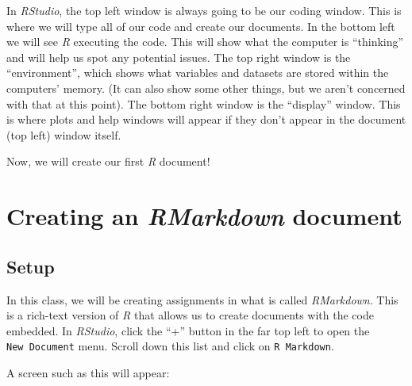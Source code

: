 \documentclass[
  letterpaper,
  DIV=11,
  numbers=noendperiod]{scrreprt}
\begin{document}
In \emph{RStudio}, the top left window is always going to be our coding
window. This is where we will type all of our code and create our
documents. In the bottom left we will see \emph{R} executing the code.
This will show what the computer is ``thinking'' and will help us spot
any potential issues. The top right window is the ``environment'', which
shows what variables and datasets are stored within the computers'
memory. (It can also show some other things, but we aren't concerned
with that at this point). The bottom right window is the ``display''
window. This is where plots and help windows will appear if they don't
appear in the document (top left) window itself.

Now, we will create our first \emph{R} document!


\chapter{\texorpdfstring{Creating an \emph{RMarkdown}
document}{Creating an RMarkdown document}}\label{creating-an-rmarkdown-document}

\section{Setup}\label{setup-1}

In this class, we will be creating assignments in what is called
\emph{RMarkdown}. This is a rich-text version of \emph{R} that allows us
to create documents with the code embedded. In \emph{RStudio}, click the
``+'' button in the far top left to open the \texttt{New\ Document}
menu. Scroll down this list and click on \texttt{R\ Markdown}.

A screen such as this will appear:
\end{document}
